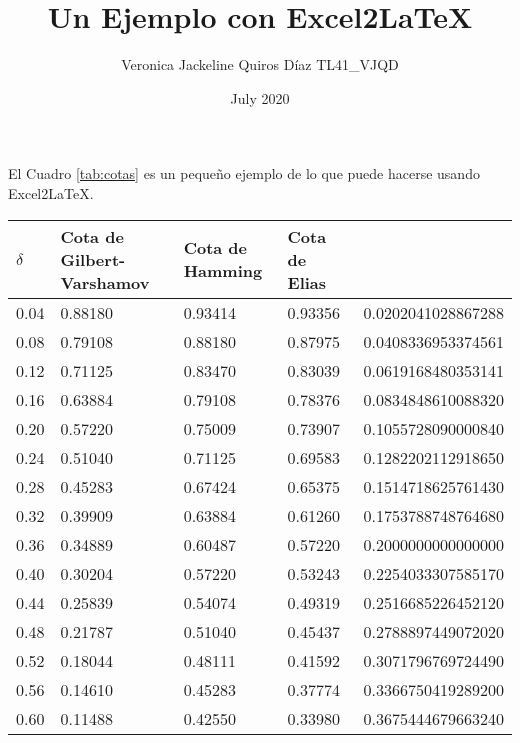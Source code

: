 \documentclass[12pt]{article}
\title{\textbf{Un Ejemplo con Excel2LaTeX}}
\author{Veronica Jackeline Quiros Díaz   TL41\_VJQD}
\date{July 2020}
\begin{document}
\maketitle
El Cuadro \ref{tab:cotas} es un pequeño ejemplo de lo que puede hacerse usando Excel2LaTeX.
\begin{table}[h]
\begin{tabular}{|l|l|l|l|l|}
\hline\hline
\textbf{$\delta$}& \textbf{Cota de Gilbert-Varshamov} & \textbf{Cota de Hamming} & \textbf{Cota de Elias} &                    \\\hline
0.04     & 0.88180                   & 0.93414         & 0.93356       & 0.0202041028867288 \\\hline
0.08     & 0.79108                   & 0.88180         & 0.87975       & 0.0408336953374561 \\\hline
0.12     & 0.71125                   & 0.83470         & 0.83039       & 0.0619168480353141 \\\hline
0.16     & 0.63884                   & 0.79108         & 0.78376       & 0.0834848610088320 \\\hline
0.20     & 0.57220                   & 0.75009         & 0.73907       & 0.1055728090000840 \\\hline
0.24     & 0.51040                   & 0.71125         & 0.69583       & 0.1282202112918650 \\\hline
0.28     & 0.45283                   & 0.67424         & 0.65375       & 0.1514718625761430 \\\hline
0.32     & 0.39909                   & 0.63884         & 0.61260       & 0.1753788748764680 \\\hline
0.36     & 0.34889                   & 0.60487         & 0.57220       & 0.2000000000000000 \\\hline
0.40     & 0.30204                   & 0.57220         & 0.53243       & 0.2254033307585170 \\\hline
0.44     & 0.25839                   & 0.54074         & 0.49319       & 0.2516685226452120 \\\hline
0.48     & 0.21787                   & 0.51040         & 0.45437       & 0.2788897449072020 \\\hline
0.52     & 0.18044                   & 0.48111         & 0.41592       & 0.3071796769724490 \\\hline
0.56     & 0.14610                   & 0.45283         & 0.37774       & 0.3366750419289200 \\\hline
0.60     & 0.11488                   & 0.42550         & 0.33980       & 0.3675444679663240 \\\hline

\end{tabular}
\end{table}
\end{document}
